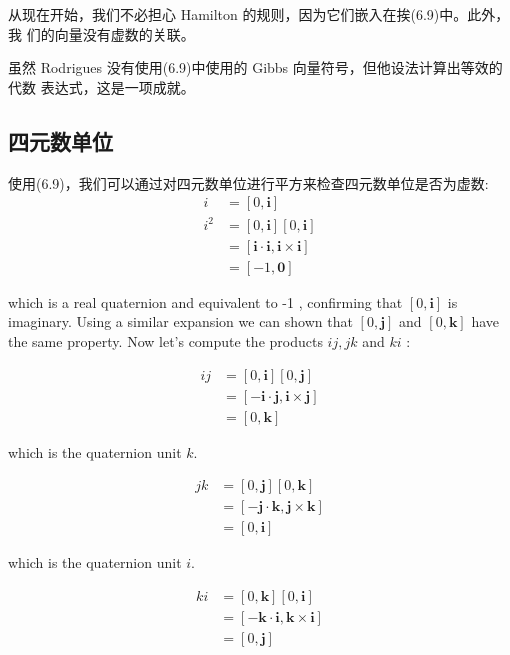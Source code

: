 从现在开始，我们不必担心 Hamilton 的规则，因为它们嵌入在挨(6.9)中。此外，我
们的向量没有虚数的关联。

虽然 Rodrigues 没有使用(6.9)中使用的 Gibbs 向量符号，但他设法计算出等效的代数
表达式，这是一项成就。

\subsection{四元数单位}
使用(6.9)，我们可以通过对四元数单位进行平方来检查四元数单位是否为虚数:
$$
    \begin{aligned}
        i     & =[0, \mathbf{i}]                                             \\
        i^{2} & =[0, \mathbf{i}][0, \mathbf{i}]                              \\
              & =[\mathbf{i} \cdot \mathbf{i}, \mathbf{i} \times \mathbf{i}] \\
              & =[-1, \mathbf{0}]
    \end{aligned}
$$

which is a real quaternion and equivalent to -1 , confirming that $[0, \mathbf{i}]$ is imaginary. Using a similar expansion we can shown that $[0, \mathbf{j}]$ and $[0, \mathbf{k}]$ have the same property. Now let's compute the products $i j, j k$ and $k i$ :

$$
    \begin{aligned}
        i j & =[0, \mathbf{i}][0, \mathbf{j}]                               \\
            & =[-\mathbf{i} \cdot \mathbf{j}, \mathbf{i} \times \mathbf{j}] \\
            & =[0, \mathbf{k}]
    \end{aligned}
$$

which is the quaternion unit $k$.

$$
    \begin{aligned}
        j k & =[0, \mathbf{j}][0, \mathbf{k}]                               \\
            & =[-\mathbf{j} \cdot \mathbf{k}, \mathbf{j} \times \mathbf{k}] \\
            & =[0, \mathbf{i}]
    \end{aligned}
$$

which is the quaternion unit $i$.

$$
    \begin{aligned}
        k i & =[0, \mathbf{k}][0, \mathbf{i}]                               \\
            & =[-\mathbf{k} \cdot \mathbf{i}, \mathbf{k} \times \mathbf{i}] \\
            & =[0, \mathbf{j}]
    \end{aligned}
$$

